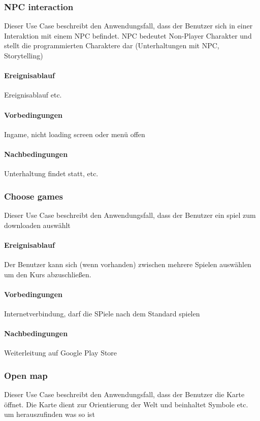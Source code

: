 		\subsubsection{NPC interaction}
			Dieser Use Case beschreibt den Anwendungsfall, dass der Benutzer sich in einer Interaktion mit einem NPC befindet. NPC bedeutet Non-Player Charakter und stellt die programmierten Charaktere dar (Unterhaltungen mit NPC, Storytelling)
			
			\paragraph{Ereignisablauf}
				Ereignisablauf etc.

			\paragraph{Vorbedingungen}
				Ingame, nicht loading screen oder menü offen
			
			\paragraph{Nachbedingungen}
				Unterhaltung findet statt, etc.
	
		\subsubsection{Choose games}
			Dieser Use Case beschreibt den Anwendungsfall, dass der Benutzer ein spiel zum downloaden auswählt
			
			\paragraph{Ereignisablauf}
				Der Benutzer kann sich (wenn vorhanden) zwischen mehrere Spielen auswählen um den Kurs abzuschließen.

			\paragraph{Vorbedingungen}
				Internetverbindung, darf die SPiele nach dem Standard spielen
			
			\paragraph{Nachbedingungen}
				Weiterleitung auf Google Play Store

		\subsubsection{Open map}
			Dieser Use Case beschreibt den Anwendungsfall, dass der Benutzer die Karte öffnet. Die Karte dient zur Orientierung der Welt und beinhaltet Symbole etc. um herauszufinden was so ist
			
